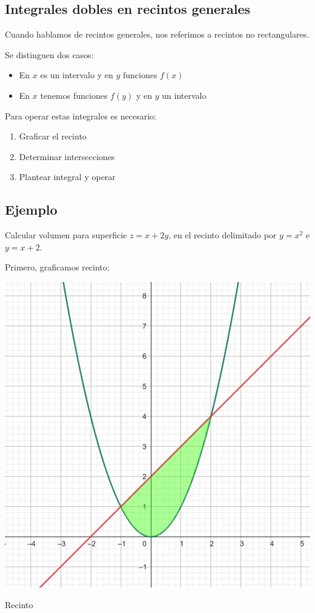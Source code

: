 \subsection{Integrales dobles en recintos generales}

Cuando hablamos de recintos generales,
nos referimos a recintos no rectangulares.

Se distinguen dos casos: 
\begin{itemize}
    \item En \(x\) es un intervalo y en \(y\) funciones \(f(x)\)
    \item En \(x\) tenemos funciones \(f(y)\) y en \(y\) un intervalo
\end{itemize}

Para operar estas integrales es necesario:

\begin{enumerate}
    \item Graficar el recinto
    \item Determinar intersecciones 
    \item Plantear integral y operar
\end{enumerate}

\subsection{Ejemplo}

Calcular volumen para superficie \(z = x + 2y\),
en el recinto delimitado por \(y = x^{2}\) e \(y = x + 2\).

Primero,
graficamos recinto:

\begin{table}
    \centering
    \includegraphics[width=\textwidth]{./img/01.png}
    \caption{Recinto}
\end{table}

